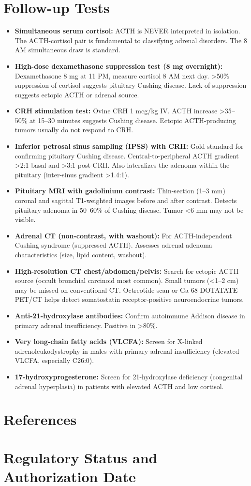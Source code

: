 \section*{Follow-up Tests}
\begin{itemize}
  \item \textbf{Simultaneous serum cortisol:} ACTH is NEVER interpreted in isolation. The ACTH-cortisol pair is fundamental to classifying adrenal disorders. The 8 AM simultaneous draw is standard.
  \item \textbf{High-dose dexamethasone suppression test (8 mg overnight):} Dexamethasone 8 mg at 11 PM, measure cortisol 8 AM next day. >50\% suppression of cortisol suggests pituitary Cushing disease. Lack of suppression suggests ectopic ACTH or adrenal source.
  \item \textbf{CRH stimulation test:} Ovine CRH 1 mcg/kg IV. ACTH increase >35--50\% at 15--30 minutes suggests Cushing disease. Ectopic ACTH-producing tumors usually do not respond to CRH.
  \item \textbf{Inferior petrosal sinus sampling (IPSS) with CRH:} Gold standard for confirming pituitary Cushing disease. Central-to-peripheral ACTH gradient >2:1 basal and >3:1 post-CRH. Also lateralizes the adenoma within the pituitary (inter-sinus gradient >1.4:1).
  \item \textbf{Pituitary MRI with gadolinium contrast:} Thin-section (1--3 mm) coronal and sagittal T1-weighted images before and after contrast. Detects pituitary adenoma in 50--60\% of Cushing disease. Tumor <6 mm may not be visible.
  \item \textbf{Adrenal CT (non-contrast, with washout):} For ACTH-independent Cushing syndrome (suppressed ACTH). Assesses adrenal adenoma characteristics (size, lipid content, washout).
  \item \textbf{High-resolution CT chest/abdomen/pelvis:} Search for ectopic ACTH source (occult bronchial carcinoid most common). Small tumors (<1--2 cm) may be missed on conventional CT. Octreotide scan or Ga-68 DOTATATE PET/CT helps detect somatostatin receptor-positive neuroendocrine tumors.
  \item \textbf{Anti-21-hydroxylase antibodies:} Confirm autoimmune Addison disease in primary adrenal insufficiency. Positive in >80\%.
  \item \textbf{Very long-chain fatty acids (VLCFA):} Screen for X-linked adrenoleukodystrophy in males with primary adrenal insufficiency (elevated VLCFA, especially C26:0).
  \item \textbf{17-hydroxyprogesterone:} Screen for 21-hydroxylase deficiency (congenital adrenal hyperplasia) in patients with elevated ACTH and low cortisol.
\end{itemize}

\section*{References}



\clearpage
\section*{Regulatory Status and Authorization Date}

\clearpage
